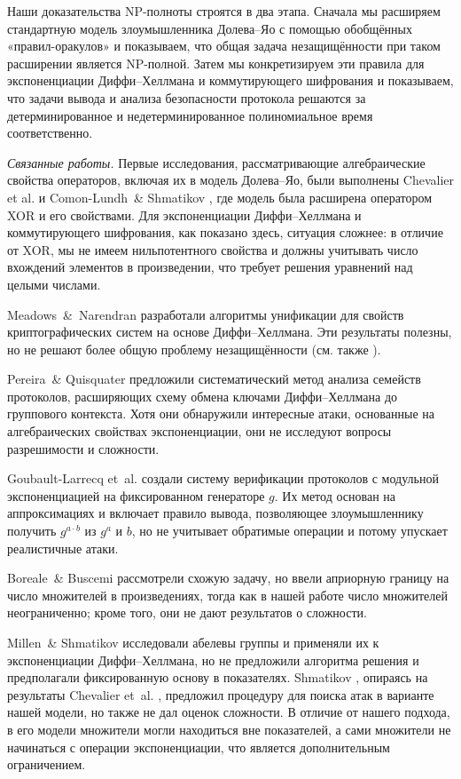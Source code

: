 Наши доказательства NP-полноты строятся в два этапа. Сначала мы расширяем стандартную модель злоумышленника Долева–Яо с помощью
обобщённых «правил-оракулов» и показываем, что общая задача незащищённости при таком расширении является NP-полной. Затем мы
конкретизируем эти правила для экспоненциации Диффи–Хеллмана и коммутирующего шифрования и показываем, что задачи вывода и анализа
безопасности протокола решаются за детерминированное и недетерминированное полиномиальное время соответственно.

\medskip
\textit{Связанные работы.} Первые исследования, рассматривающие алгебраические свойства операторов, включая их в модель Долева–Яо,
были выполнены Chevalier et al. \cite{ChevalierXOR2003} и Comon-Lundh \& Shmatikov \cite{ComonLundhShmatikov2003}, где модель
была расширена оператором XOR и его свойствами. Для экспоненциации Диффи–Хеллмана и коммутирующего шифрования, как показано здесь,
ситуация сложнее: в отличие от XOR, мы не имеем нильпотентного свойства и должны учитывать число вхождений элементов в произведении,
что требует решения уравнений над целыми числами.

Meadows \& Narendran \cite{MeadowsNarendran2002} разработали алгоритмы унификации для свойств криптографических систем на основе
Диффи–Хеллмана. Эти результаты полезны, но не решают более общую проблему незащищённости (см. также \cite{KapurNarendranWang2003}).

Pereira \& Quisquater \cite{PereiraQuisquater2004} предложили систематический метод анализа семейств протоколов, расширяющих схему
обмена ключами Диффи–Хеллмана до группового контекста. Хотя они обнаружили интересные атаки, основанные на алгебраических свойствах
экспоненциации, они не исследуют вопросы разрешимости и сложности.

Goubault-Larrecq et al. \cite{GoubaultLarrecq2005} создали систему верификации протоколов с модульной экспоненциацией на
фиксированном генераторе \(g\). Их метод основан на аппроксимациях и включает правило вывода, позволяющее злоумышленнику получить
\(g^{a\cdot b}\) из \(g^a\) и \(b\), но не учитывает обратимые операции и потому упускает реалистичные атаки.

Boreale \& Buscemi \cite{BorealeBuscemi2003} рассмотрели схожую задачу, но ввели априорную границу на число множителей в
произведениях, тогда как в нашей работе число множителей неограниченно; кроме того, они не дают результатов о сложности.

Millen \& Shmatikov \cite{MillenShmatikov2003} исследовали абелевы группы и применяли их к экспоненциации Диффи–Хеллмана, но не
предложили алгоритма решения и предполагали фиксированную основу в показателях. Shmatikov \cite{Shmatikov2004}, опираясь на результаты
Chevalier et al. \cite{ChevalierDH2003}, предложил процедуру для поиска атак в варианте нашей модели, но также не дал оценок
сложности. В отличие от нашего подхода, в его модели множители могли находиться вне показателей, а сами множители не начинаться с
операции экспоненциации, что является дополнительным ограничением.

